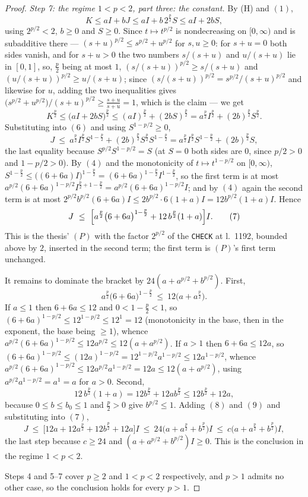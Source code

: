 \begin{proof}
\emph{Step 7: the regime $1<p<2$, part three: the constant.}  By (H) and $(1)$,
\[
K\le aI+bJ\le aI+b\,2^{\frac p2}S\le aI+2bS ,
\]
using $2^{p/2}<2$, $b\ge0$ and $S\ge0$.  Since $t\mapsto t^{p/2}$ is
nondecreasing on $[0,\infty)$ and is subadditive there ---
$(s+u)^{p/2}\le s^{p/2}+u^{p/2}$ for $s,u\ge0$: for $s+u=0$ both sides
vanish, and for $s+u>0$ the two numbers $s/(s+u)$ and $u/(s+u)$ lie in $[0,1]$,
so, $\frac p2$ being at most $1$, $(s/(s+u))^{p/2}\ge s/(s+u)$ and
$(u/(s+u))^{p/2}\ge u/(s+u)$; since
$(s/(s+u))^{p/2}=s^{p/2}/(s+u)^{p/2}$ and likewise for $u$, adding the two
inequalities gives
$\bigl(s^{p/2}+u^{p/2}\bigr)/(s+u)^{p/2}\ge\frac{s+u}{s+u}=1$, which is the
claim --- we get
\[
K^{\frac p2}\le\bigl(aI+2bS\bigr)^{\frac p2}
\le(aI)^{\frac p2}+(2bS)^{\frac p2}
=a^{\frac p2}I^{\frac p2}+(2b)^{\frac p2}S^{\frac p2} .
\]
Substituting into $(6)$ and using $S^{1-p/2}\ge0$,
\[
J\ \le\ a^{\frac p2}I^{\frac p2}S^{1-\frac p2}
+(2b)^{\frac p2}S^{\frac p2}S^{1-\frac p2}
=a^{\frac p2}I^{\frac p2}S^{1-\frac p2}+(2b)^{\frac p2}S ,
\]
the last equality because $S^{p/2}S^{1-p/2}=S$ (at $S=0$ both sides are $0$,
since $p/2>0$ and $1-p/2>0$).  By $(4)$ and the monotonicity of
$t\mapsto t^{1-p/2}$ on $[0,\infty)$,
$S^{1-\frac p2}\le\bigl((6+6a)I\bigr)^{1-\frac p2}
=(6+6a)^{1-\frac p2}I^{1-\frac p2}$, so the first term is at most
$a^{p/2}(6+6a)^{1-p/2}I^{\frac p2+1-\frac p2}=a^{p/2}(6+6a)^{1-p/2}I$; and by
$(4)$ again the second term is at most
$2^{p/2}b^{p/2}(6+6a)I\le2b^{p/2}\cdot6(1+a)I=12b^{p/2}(1+a)I$.  Hence
\[
J\ \le\ \Bigl[a^{\frac p2}\bigl(6+6a\bigr)^{1-\frac p2}
+12\,b^{\frac p2}(1+a)\Bigr]I .
\tag{7}
\]
This is the thesis' $(P)$ with the factor $2^{p/2}$ of the \texttt{CHECK} at
l.~1192, bounded above by $2$, inserted in the second term; the first term is
$(P)$'s first term unchanged.

It remains to dominate the bracket by $24(a+a^{p/2}+b^{p/2})$.  First,
\[
a^{\frac p2}\bigl(6+6a\bigr)^{1-\frac p2}\ \le\ 12\bigl(a+a^{\frac p2}\bigr).
\tag{8}
\]
If $a\le1$ then $6+6a\le12$ and $0<1-\frac p2<1$, so
$(6+6a)^{1-p/2}\le12^{1-p/2}\le12^{1}=12$ (monotonicity in the base, then in
the exponent, the base being $\ge1$), whence
$a^{p/2}(6+6a)^{1-p/2}\le12a^{p/2}\le12(a+a^{p/2})$.  If $a>1$ then
$6+6a\le12a$, so
$(6+6a)^{1-p/2}\le(12a)^{1-p/2}=12^{1-p/2}a^{1-p/2}\le12a^{1-p/2}$, whence
$a^{p/2}(6+6a)^{1-p/2}\le12a^{p/2}a^{1-p/2}=12a\le12(a+a^{p/2})$, using
$a^{p/2}a^{1-p/2}=a^{1}=a$ for $a>0$.  Second,
\[
12\,b^{\frac p2}(1+a)=12b^{\frac p2}+12ab^{\frac p2}\le12b^{\frac p2}+12a ,
\tag{9}
\]
because $0\le b\le b_0\le1$ and $\frac p2>0$ give $b^{p/2}\le1$.  Adding $(8)$
and $(9)$ and substituting into $(7)$,
\[
J\ \le\ \bigl[12a+12a^{\frac p2}+12b^{\frac p2}+12a\bigr]I
\ \le\ 24\bigl(a+a^{\frac p2}+b^{\frac p2}\bigr)I
\ \le\ c\bigl(a+a^{\frac p2}+b^{\frac p2}\bigr)I ,
\]
the last step because $c\ge24$ and $(a+a^{p/2}+b^{p/2})I\ge0$.  This is the
conclusion in the regime $1<p<2$.

Steps 4 and 5--7 cover $p\ge2$ and $1<p<2$ respectively, and $p>1$ admits no
other case, so the conclusion holds for every $p>1$.
\end{proof}
